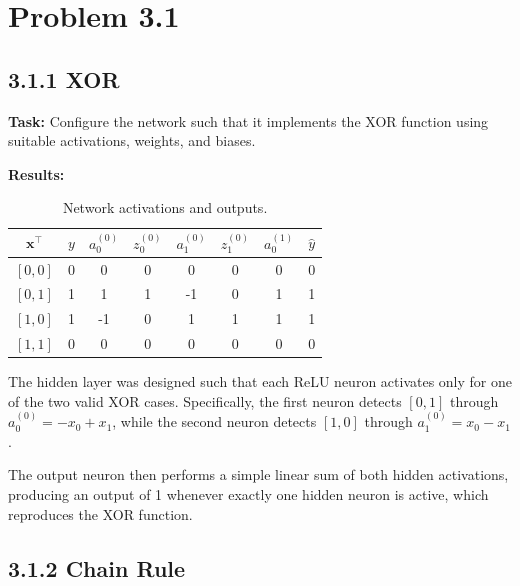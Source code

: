 \documentclass{article}
\begin{document}

\section*{Problem 3.1}

\subsection*{3.1.1 XOR}

\textbf{Task:} Configure the network such that it implements the XOR function using suitable activations, weights, and biases.

\vspace{0.3cm}

\textbf{Results:}

\begin{table}[H]
\centering
\caption{Network activations and outputs.}

\begin{tabular}{cccccccc}
\toprule
\(\mathbf{x}^\top\) &
\(y\) &
\(a_0^{(0)}\) &
\(z_0^{(0)}\) &
\(a_1^{(0)}\) &
\(z_1^{(0)}\) &
\(a_0^{(1)}\) &
\(\hat{y}\) \\
\midrule
\([0,0]\) & 0 & 0  & 0 & 0  & 0 & 0 & 0 \\
\([0,1]\) & 1 & 1  & 1 & -1 & 0 & 1 & 1 \\
\([1,0]\) & 1 & -1 & 0 & 1  & 1 & 1 & 1 \\
\([1,1]\) & 0 & 0  & 0 & 0  & 0 & 0 & 0 \\
\bottomrule
\end{tabular}

\end{table}

The hidden layer was designed such that each ReLU neuron activates only for one of the two valid XOR cases. Specifically, the first neuron detects \([0,1]\) through \(a_0^{(0)} = -x_0 + x_1\), while the second neuron detects \([1,0]\) through \(a_1^{(0)} = x_0 - x_1\).

The output neuron then performs a simple linear sum of both hidden activations, producing an output of 1 whenever exactly one hidden neuron is active, which reproduces the XOR function.


\subsection*{3.1.2 Chain Rule}
\end{document}

